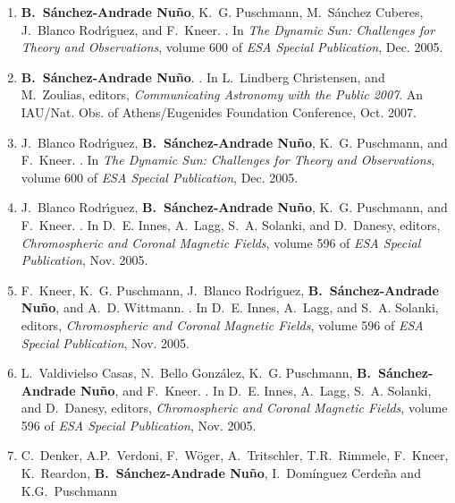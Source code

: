 \documentclass[goettingen,print]{thesis}
\begin{document}
\begin{enumerate}
\item
\textbf{B.~{S{\'a}nchez-Andrade Nu{\~n}o}}, K.~G. {Puschmann}, M.~{S{\'a}nchez Cuberes},
  J.~{Blanco Rodr{\'{\i}}guez}, and F.~{Kneer}.
.
\newblock In {\em The Dynamic Sun: Challenges for Theory and Observations},
  volume 600 of {\em ESA Special Publication}, Dec. 2005.
\item
\textbf{B.~{S{\'a}nchez-Andrade Nu{\~n}o}}. 
.
\newblock  In L.~Lindberg Christensen, and M.~Zoulias, editors, {\em
  Communicating Astronomy with the Public 2007}. An IAU/Nat. Obs. of Athens/Eugenides Foundation Conference,  {\em } Oct. 2007.
  

\item
J.~{Blanco Rodr{\'{\i}}guez}, \textbf{B.~{S{\'a}nchez-Andrade Nu{\~n}o}}, K.~G.
  {Puschmann}, and F.~{Kneer}.
.
\newblock In {\em The Dynamic Sun: Challenges for Theory and Observations},
  volume 600 of {\em ESA Special Publication}, Dec. 2005.

\item
J.~{Blanco Rodr{\'{\i}}guez}, \textbf{B.~{S{\'a}nchez-Andrade Nu{\~n}o}}, K.~G.
  {Puschmann}, and F.~{Kneer}.
.
\newblock In D.~E. {Innes}, A.~{Lagg}, S.~A. {Solanki}, and D.~Danesy, editors, {\em
  Chromospheric and Coronal Magnetic Fields}, volume 596 of {\em ESA Special
  Publication}, Nov. 2005.

\item
F.~{Kneer}, K.~G. {Puschmann}, J.~{Blanco Rodr{\'{\i}}guez},
  \textbf{B.~{S{\'a}nchez-Andrade Nu{\~n}o}}, and A.~D. {Wittmann}.
.
\newblock In D.~E. {Innes}, A.~{Lagg}, and S.~A. {Solanki}, editors, {\em
  Chromospheric and Coronal Magnetic Fields}, volume 596 of {\em ESA Special
  Publication}, Nov. 2005.

\item
L.~{Valdivielso Casas}, N.~{Bello Gonz{\'a}lez}, K.~G. {Puschmann},
  \textbf{B.~{S{\'a}nchez-Andrade Nu{\~n}o}}, and F.~{Kneer}.
.
\newblock In D.~E. {Innes}, A.~{Lagg}, S.~A. {Solanki}, and D.~Danesy, editors, {\em
  Chromospheric and Coronal Magnetic Fields}, volume 596 of {\em ESA Special
  Publication}, Nov. 2005.
\item
C.~Denker, A.P.~Verdoni, F.~W\"oger, A.~Tritschler, T.R.~Rimmele, F.~Kneer,
K.~Reardon, \textbf{B.~S\'anchez-Andrade Nu\~no}, I.~Dom\'inguez Cerde\~na and K.G.~Puschmann
  
\end{enumerate}
\end{document}
